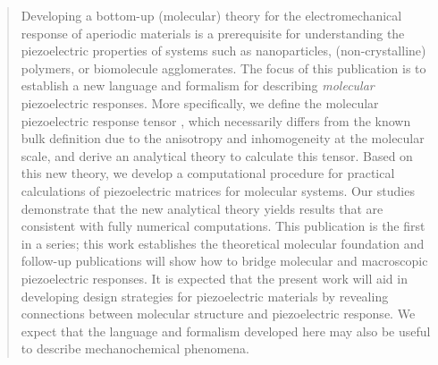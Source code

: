 \begin{abstract}
  Developing a bottom-up (molecular) theory for the electromechanical response of aperiodic materials is a prerequisite
  for understanding the piezoelectric properties of systems such as nanoparticles, (non-crystalline) polymers, or biomolecule
  agglomerates. 
  The focus of this publication is to establish a new language and formalism for describing {\em molecular} 
  piezoelectric responses. 
  More specifically, we define the molecular piezoelectric response tensor \dd{}, which
  necessarily differs
  from the known bulk definition due to the anisotropy and inhomogeneity at the molecular scale, and derive
  an analytical theory to calculate this tensor. Based on this new theory, we develop a computational procedure for
  practical calculations of piezoelectric matrices for molecular systems. 
  Our studies demonstrate that the new analytical theory yields results that are consistent with fully numerical
  computations.  
  This
  publication is the first in a series; 
  this work establishes the theoretical molecular foundation and  
  follow-up publications will show how to bridge molecular and macroscopic
  piezoelectric responses. 
  It is expected that the present work will aid in developing design strategies for piezoelectric materials by revealing
  connections between molecular structure and piezoelectric response. 
  We expect that the language and formalism developed here may also be useful to describe mechanochemical phenomena. 
\end{abstract}
